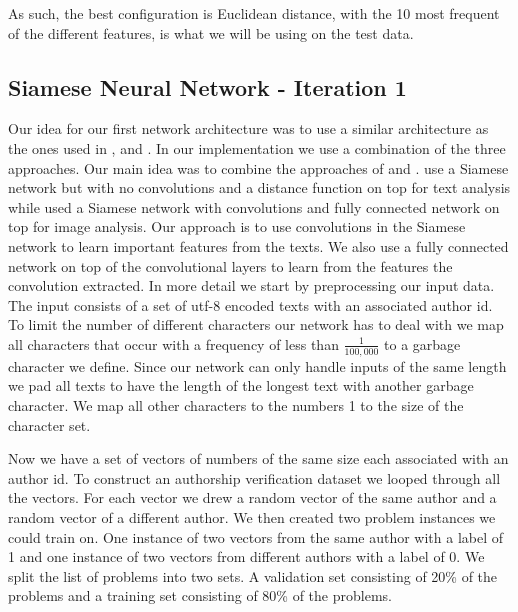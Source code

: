 As such, the best configuration is Euclidean distance, with the 10 most frequent
of the different features, is what we will be using on the test data.


\subsection{Siamese Neural Network - Iteration 1}


Our idea for our first network architecture was to use a similar architecture
as the ones used in \cite{Koch2015SiameseNN}, \cite{NIPS1993_769} and
\cite{qian:2018}. In our implementation we use a combination of the three
approaches. Our main idea was to combine the approaches of \cite{qian:2018}
and \cite{Koch2015SiameseNN}. \cite{qian:2018} use a Siamese network but
with no convolutions and a distance function on top for text analysis while
\cite{Koch2015SiameseNN} used a Siamese network with convolutions and fully
connected network on top for image analysis. Our approach is to use convolutions
in the Siamese network to learn important features from the texts. We also use
a fully connected network on top of the convolutional layers to learn from the
features the convolution extracted. In more detail we start by preprocessing
our input data. The input consists of a set of utf-8 encoded texts with an
associated author id. To limit the number of different characters our network
has to deal with we map all characters that occur with a frequency of less than
$\frac{1}{100,000}$ to a garbage character we define. Since our network can only
handle inputs of the same length we pad all texts to have the length of the
longest text with another garbage character. We map all other characters to the
numbers 1 to the size of the character set.

Now we have a set of vectors of numbers of the same size each associated with
an author id. To construct an authorship verification dataset we looped through
all the vectors. For each vector we drew a random vector of the same author and
a random vector of a different author. We then created two problem instances we
could train on. One instance of two vectors from the same author with a label of
1 and one instance of two vectors from different authors with a label of 0. We
split the list of problems into two sets. A validation set consisting of 20\% of
the problems and a training set consisting of 80\% of the problems.

